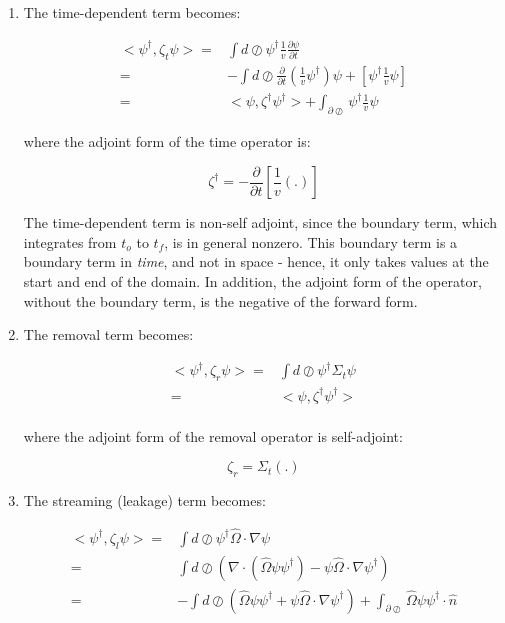 \documentclass[10pt]{article}
\newcommand{\hO}{\hat{\Omega}}
\begin{document}
\begin{flushleft}
\begin{enumerate}
\item The time-dependent term becomes:

\begin{equation}
\label{eq:AdjointTime}
\begin{aligned}
<\psi^\dagger, \zeta_t\psi> = & \int d\oslash \psi^\dagger \frac{1}{v} \frac{\partial\psi}{\partial t}\\
= & -\int d\oslash \frac{\partial}{\partial t} \left(\frac{1}{v}\psi^\dagger\right)\psi + [\psi^\dagger \frac{1}{v} \psi]\\
= & <\psi, \zeta^\dagger\psi^\dagger> + \int_{\partial\oslash}\psi^\dagger \frac{1}{v} \psi
\end{aligned}
\end{equation}

where the adjoint form of the time operator is:

\begin{equation}
\zeta^\dagger = -\frac{\partial}{\partial t}\left\lbrack\frac{1}{v}(.)\right\rbrack
\end{equation}

The time-dependent term is non-self adjoint, since the boundary term, which integrates from \(t_o\) to \(t_f\), is in general nonzero. This boundary term is a boundary term in \textit{time}, and not in space - hence, it only takes values at the start and end of the domain. In addition, the adjoint form of the operator, without the boundary term, is the negative of the forward form. 

\item The removal term becomes:

\begin{equation}
\begin{aligned}
<\psi^\dagger,\zeta_r\psi>= & \int d\oslash \psi^\dagger \Sigma_t\psi\\
= & <\psi,\zeta^\dagger\psi^\dagger>\\
\end{aligned}
\end{equation}

where the adjoint form of the removal operator is self-adjoint:

\begin{equation}
\zeta_r=\Sigma_t(.)
\end{equation}

\item The streaming (leakage) term becomes:

\begin{equation}
\begin{aligned}
<\psi^\dagger,\zeta_l\psi>= & \int d\oslash \psi^\dagger\hO  \cdot\nabla\psi\\
= & \int d\oslash \left(\nabla\cdot(\hO  \psi\psi^\dagger)-\psi\hO  \cdot\nabla\psi^\dagger\right)\\
= & -\int d\oslash \left(\hO  \psi\psi^\dagger +\psi\hO  \cdot\nabla\psi^\dagger\right)+ \int_{\partial\oslash}\hO  \psi\psi^\dagger\cdot\hat{n}\\
\end{aligned}
\end{equation}


\end{enumerate}
\end{flushleft}
\end{document}
